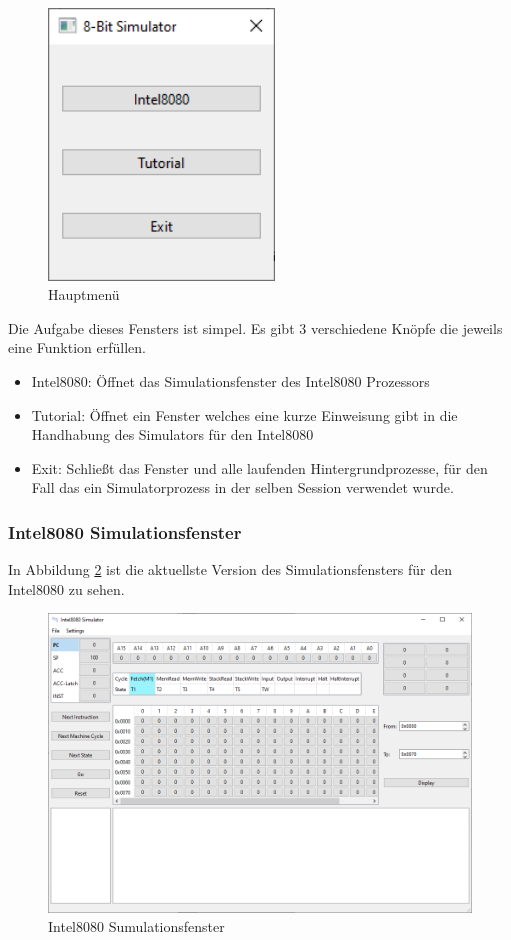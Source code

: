 \documentclass[12pt]{article}
\begin{document}
\begin{figure}[H]
\centering
\includegraphics[width=6cm]{bilder/Hauptmenue}
\caption{Hauptmenü}
\label{fig:Hauptmenue}
\end{figure}

\noindent
Die Aufgabe dieses Fensters ist simpel. Es gibt 3 verschiedene Knöpfe die jeweils eine Funktion erfüllen.
\begin{itemize}
	\item Intel8080: Öffnet das Simulationsfenster des Intel8080 Prozessors
	\item Tutorial: Öffnet ein Fenster welches eine kurze Einweisung gibt in die Handhabung des Simulators für den Intel8080
	\item Exit: Schließt das Fenster und alle laufenden Hintergrundprozesse, für den Fall das ein Simulatorprozess in der selben Session verwendet wurde.
\end{itemize}

\subsubsection{Intel8080 Simulationsfenster}
In Abbildung \ref{fig:I8080MW} ist die aktuellste Version des Simulationsfensters für den Intel8080 zu sehen.\vspace{10pt}

\begin{figure}[H]
\centering
\includegraphics[width=15cm]{bilder/Intel8080_MainWindow}
\caption{Intel8080 Sumulationsfenster}
\label{fig:I8080MW}
\end{figure}
\end{document}
